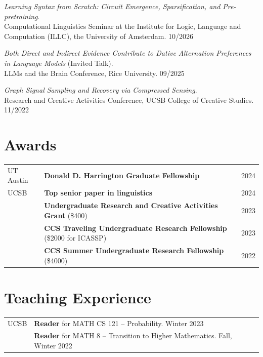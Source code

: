 \documentclass[11pt, letterpaper]{article}
\makeatletter
\newenvironment{cvtable}[1]{%
  \begin{tabular}{@{}p{#1} p{\dimexpr\textwidth-#1-4em} r@{}}
}{%
  \end{tabular}
}
\makeatother
\begin{document}
\begin{etaremune}
  \item \textit{Learning Syntax from Scratch: Circuit Emergence, Sparsification, and Pre-pretraining}. \\ Computational Linguistics Seminar at the Institute for Logic, Language and Computation (ILLC), the University of Amsterdam. \hfill 10/2026

  \item \textit{Both Direct and Indirect Evidence Contribute to Dative Alternation Preferences in Language Models} (Invited Talk). \\
    LLMs and the Brain Conference, Rice University. \hfill 09/2025

  \item \textit{Graph Signal Sampling and Recovery via Compressed Sensing}. \\
    Research and Creative Activities Conference, UCSB College of Creative Studies. \hfill 11/2022
\end{etaremune}

\section*{Awards}

\begin{cvtable}{7em}
  UT Austin & \textbf{Donald D. Harrington Graduate Fellowship} & 2024 \\
  UCSB      & \textbf{Top senior paper in linguistics} & 2024 \\
            & \textbf{Undergraduate Research and Creative Activities Grant} (\$400) & 2023 \\
            & \textbf{CCS Traveling Undergraduate Research Fellowship} (\$2000 for ICASSP) & 2023 \\
            & \textbf{CCS Summer Undergraduate Research Fellowship} (\$4000) & 2022 \\
\end{cvtable}

\section*{Teaching Experience}

\begin{cvtable}{7em}
  UCSB & \textbf{Reader} for MATH CS 121 -- Probability. Winter 2023 \\
       & \textbf{Reader} for MATH 8 -- Transition to Higher Mathematics. Fall, Winter 2022 \\
\end{cvtable}
\end{document}
